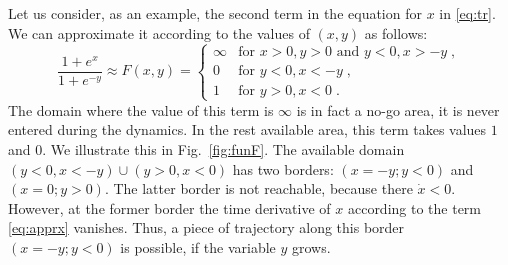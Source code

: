 \documentclass[3p,number,review,sort&compress]{elsarticle}
\begin{document}
Let us consider, as an example, the second term in the equation for $x$ in \eqref{eq:tr}.
We can approximate it according to the values of $(x,y)$ as follows:
\begin{equation}
\frac{1+e^x}{1+e^{-y}}\approx F(x,y)=\begin{cases}
\infty &\text{for } x>0,y>0 \text{ and } y<0,x>-y\;,\\
0 & \text{for } y<0,x<-y\;,\\
1 & \text{for } y>0,x<0\;.
\end{cases}
\label{eq:apprx}    
\end{equation}
The domain where the value of this term is $\infty$ is in fact a no-go area,
it is never entered during the dynamics. In the rest available area, this term takes values $1$ and $0$. We illustrate this in Fig.~\ref{fig:funF}. The available domain
$(y<0,x<-y)\cup (y>0,x<0)$ has two borders: $(x=-y; y<0)$ and $(x=0;y>0)$. The latter border
is not reachable, because there $\dot x<0$. However, at the former border the time derivative
of $x$ according to the term \eqref{eq:apprx} vanishes. Thus, a piece of trajectory
along this border $(x=-y; y<0)$ is possible, if the variable $y$ grows. 
\end{document}
